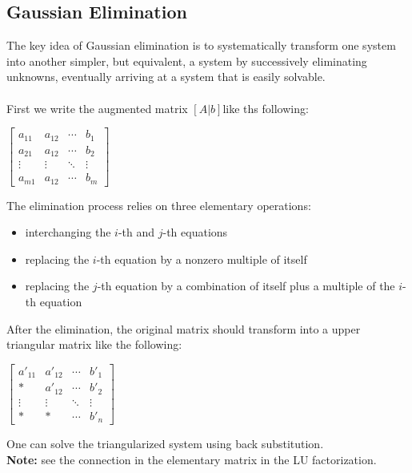 \documentclass[UTF8,a4paper, 10pt, openany]{svmono}
\begin{document}
\subsection{Gaussian Elimination}
The key idea of Gaussian elimination is to systematically transform one system into another simpler, but equivalent, a system by successively eliminating unknowns, eventually arriving at a system that is easily solvable.\\
\\First we write the augmented matrix $[A|b]$like ths following:
\begin{center}
$\left[
\begin{array}{ccc|c}
a_{11} & a_{12} & \cdots & b_{1} \\ 
a_{21} & a_{12} & \cdots & b_{2} \\
\vdots & \vdots & \ddots & \vdots \\
a_{m1} & a_{12} & \cdots & b_{m} 
    \end{array}
\right]$
\end{center}
The elimination process relies on three elementary operations:
\begin{itemize}
\item{interchanging the $i$-th and $j$-th equations}
\item{replacing the $i$-th equation by a nonzero multiple of itself}
\item{replacing the $j$-th equation by a combination of itself plus a multiple
of the $i$-th equation}
\end{itemize}
After the elimination, the original matrix should transform into a upper triangular matrix like the following:
\begin{center}
$\left[
\begin{array}{ccc|c}
a'_{11} & a'_{12} & \cdots & b'_{1} \\ 
* & a'_{12} & \cdots & b'_{2} \\
\vdots & \vdots & \ddots & \vdots \\
* & * & \cdots & b'_{n} 
    \end{array}
\right]$
\end{center}
One can solve the triangularized system using back substitution.\\
\textbf{Note: }see the connection in the elementary matrix in the LU factorization.
\end{document}
